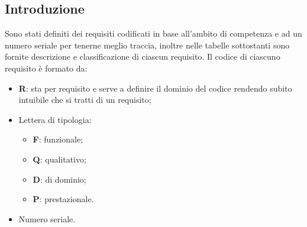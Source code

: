 \subsection{Introduzione}
Sono stati definiti dei requisiti codificati in base all'ambito di competenza e ad un numero seriale per tenerne meglio traccia, inoltre nelle tabelle sottostanti sono fornite descrizione e classificazione di ciascun requisito.
\tabularnewline
Il codice di ciascuno requisito è formato da:
\begin{itemize}
	\item \textbf{R}: sta per requisito e serve a definire il dominio del codice rendendo subito intuibile che si tratti di un requisito;
	\item Lettera di tipologia:
	\begin{itemize}
		\item \textbf{F}: funzionale;
		\item \textbf{Q}: qualitativo;
		\item \textbf{D}: di dominio;
		\item \textbf{P}: prestazionale.
	\end{itemize}
	\item Numero seriale.
\end{itemize}

